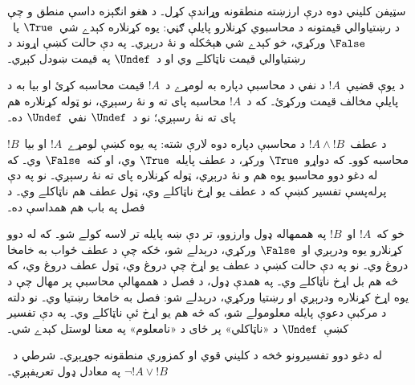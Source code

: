 \documentclass[../../../include/open-logic-section]{subfiles}
\begin{document}


سټيفن کليني دوه درې ارزښته منطقونه وړاندې کړل۔ د هغو انګېزه داسې منطق
و چې د رښتياوالي قيمتونه د محاسبوي کړنلارو پايلې ګڼي: يوه کړنلاره
کېدے شي~$\True$ يا~$\False$ ورکړي، خو کېدے شي هېڅکله و نۀ درېږي۔
په دې حالت کښې اړوند د رښتياوالي قيمت ناټاکلے وي او د~$\Undef$
په قيمت ښودل کېږي۔

د يوې قضيې~$!A$ د نفي د محاسبې دپاره به لومړے د~$!A$ قيمت
محاسبه کړئ او بيا به د پايلې مخالف قيمت ورکړئ۔ که د~$!A$ محاسبه
پای ته و نۀ رسېږي، نو ټوله کړنلاره هم پای ته نۀ رسېږي؛ نو د~$\Undef$
نفي~$\Undef$ ده۔

د عطف~$!A \land !B$ د محاسبې دپاره دوه لارې شته: په يوه کښې
لومړے~$!A$ او بيا~$!B$ محاسبه کوو۔ که دواړو~$\True$ ورکړ، د عطف
پايله~$\True$ وي، او کنه~$\False$ وي۔ که له دغو دوو محاسبو يوه
هم و نۀ درېږي، ټوله کړنلاره پای ته نۀ رسېږي۔ نو په دې پرله‌پسې
تفسير کښې که د عطف يو اړخ ناټاکلے وي، ټول عطف هم ناټاکلے وي۔
د فصل په باب هم همداسې ده۔

خو که~$!A$ او~$!B$ په هممهاله ډول وارزوو، تر دې ښه پايله
تر لاسه کولے شو۔ که له دوو کړنلارو يوه ودرېږي او~$\False$
ورکړي، درېدلے شو، ځکه چې د عطف ځواب به خامخا دروغ وي۔ نو په
دې حالت کښې د عطف يو اړخ چې دروغ وي، ټول عطف دروغ وي، که څه هم
بل اړخ ناټاکلے وي۔ په همدې ډول، د فصل د هممهالې محاسبې پر مهال
چې د يوه اړخ کړنلاره ودرېږي او رښتيا ورکړي، درېدلے شو: فصل به
خامخا رښتيا وي۔ نو دلته د مرکبې دعوې پايله معلومولے شو، که څه
هم يو اړخ ئې ناټاکلے وي۔ په دې تفسير کښې~$\Undef$ د «ناټاکلي»
پر ځای د «نامعلوم» په معنا لوستل کېدے شي۔

له دغو دوو تفسيرونو څخه د کليني قوي او کمزوري منطقونه جوړېږي۔
شرطي د~$\lnot !A \lor !B$ په معادل ډول تعريفېږي۔
\end{document}
